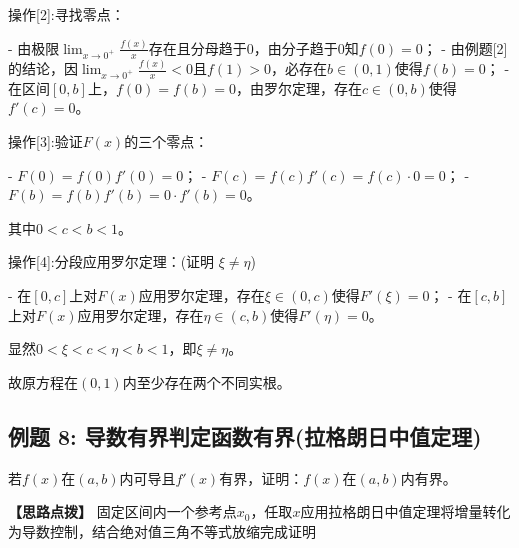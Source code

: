 \documentclass[11pt,a4paper,UTF8]{ctexart}
\begin{document}
操作[2]:寻找零点：

\begin{solbox}[分步推导与答题规范]
- 由极限$\lim_{x \to 0^+} \frac{f(x)}{x}$存在且分母趋于0，由分子趋于0知$f(0) = 0$；
- 由例题[2]的结论，因$\lim_{x \to 0^+} \frac{f(x)}{x} < 0$且$f(1) > 0$，必存在$b \in (0, 1)$使得$f(b) = 0$；
- 在区间$[0, b]$上，$f(0) = f(b) = 0$，由罗尔定理，存在$c \in (0, b)$使得$f'(c) = 0$。
\end{solbox}

操作[3]:验证$F(x)$的三个零点：

\begin{solbox}[分步推导与答题规范]
- $F(0) = f(0)f'(0) = 0$；
- $F(c) = f(c)f'(c) = f(c) \cdot 0 = 0$；
- $F(b) = f(b)f'(b) = 0 \cdot f'(b) = 0$。

其中$0 < c < b < 1$。
\end{solbox}

操作[4]:分段应用罗尔定理：(证明 $\xi \neq \eta$)

\begin{solbox}[分步推导与答题规范]
- 在$[0, c]$上对$F(x)$应用罗尔定理，存在$\xi \in (0, c)$使得$F'(\xi) = 0$；
- 在$[c, b]$上对$F(x)$应用罗尔定理，存在$\eta \in (c, b)$使得$F'(\eta) = 0$。

显然$0 < \xi < c < \eta < b < 1$，即$\xi \neq \eta$。

故原方程在$(0, 1)$内至少存在两个不同实根。
\end{solbox}


\subsection{例题 8: 导数有界判定函数有界(拉格朗日中值定理)}

若$f(x)$在$(a, b)$内可导且$f'(x)$有界，证明：$f(x)$在$(a, b)$内有界。

\textbf{\color{DeepPurple}【思路点拨】} 固定区间内一个参考点$x_0$，任取$x$应用拉格朗日中值定理将增量转化为导数控制，结合绝对值三角不等式放缩完成证明
\end{document}
